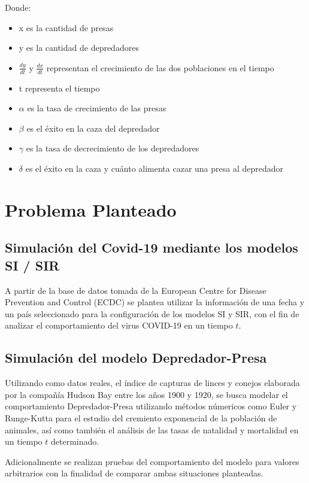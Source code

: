 \documentclass[a4paper,12pt]{article}
\begin{document}
Donde: \par

\begin{itemize}
    \item x es la cantidad de presas
    \item y es la cantidad de depredadores
    \item $\frac{dy}{dt}$ y $\frac{dx}{dt}$ representan el crecimiento de las dos poblaciones en el tiempo
    \item t representa el tiempo
    \item $\alpha$ es la tasa de crecimiento de las presas
    \item $\beta$ es el éxito en la caza del depredador
    \item $\gamma$ es la tasa de decrecimiento de los depredadores
    \item $\delta$ es el éxito en la caza y cuánto alimenta cazar una presa al depredador
\end{itemize}
 

\section{Problema Planteado}

\subsection{Simulación del Covid-19 mediante los modelos SI / SIR}

A partir de la base de datos tomada de la European Centre for Disease Prevention and Control (ECDC) se plantea utilizar la información de una fecha y un país seleccionado para la configuración de los modelos SI y SIR, con el fin de analizar el comportamiento del virus COVID-19 en un tiempo $t$.   \par

\subsection{Simulación del modelo Depredador-Presa}

Utilizando como datos reales, el índice de capturas de linces y conejos elaborada por la compañía Hudson Bay entre los años 1900 y 1920, se busca modelar el comportamiento Depredador-Presa utilizando métodos númericos como Euler y Runge-Kutta para el estudio del cremiento exponencial de la población de animales, así como también el análisis de las tasas de natalidad y mortalidad en un tiempo $t$ determinado. \par
Adicionalmente se realizan pruebas del comportamiento del modelo para valores arbitrarios con la finalidad de comparar ambas situaciones planteadas.
\end{document}
